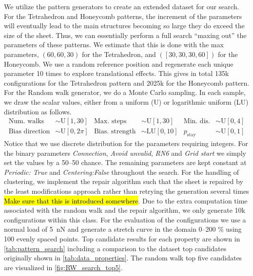We utilize the pattern generators to create an extended dataset for our search. For the Tetrahedron and Honeycomb patterns, the increment of the parameters will eventually lead to the main structures becoming so large they do exceed the size of the sheet. Thus, we can essentially perform a
full search ``maxing out'' the parameters of these patterns. We estimate
that this is done with the max parameters, $(60, 60, 30)$ for the Tetrahedron,
and $([30, 30, 30, 60])$ for the Honeycomb. We use a random reference position
and regenerate each unique parameter 10 times to explore translational effects. This gives in total 135k configurations for the
Tetrahedron pattern and 2025k for the Honeycomb pattern. For the Random walk
generator, we do a Monte Carlo sampling. In each sample, we draw the scalar values, either from a uniform (U) or logarithmic uniform (LU) distribution as follows.
\begin{align*}
  \text{Num. walks} &\sim \text{U}[1, 30] & \text{Max. steps} &\sim \text{U}[1,30]  & \text{Min. dis.} &\sim \text{U}[0,4] \\
  \text{Bias direction} &\sim \text{U}[0, 2\pi] & \text{Bias. strength} &\sim \text{LU}[0,10]  & p_{\text{stay}} &\sim \text{U}[0,1]  
\end{align*}
Notice that we use discrete distribution for the parameters requiring integers. For the binary parameters \textit{Connection}, \textit{Avoid unvalid},
\textit{RN6} and \textit{Grid start} we simply set the values by a 50--50 chance. The remaining parameters are kept constant at \textit{Periodic: True} and \textit{Centering:False} throughout the search. For the handling of clustering, we implement the repair algorithm such that the sheet is repaired by the least modifications approach rather than retrying the generation several times \hl{Make sure that this is introduced somewhere}. Due to the extra computation time associated with the
random walk and the repair algorithm, we only generate 10k configurations within
this class. For the evaluation of the configurations we use a normal load of \SI{5}{nN} and generate a stretch curve in the domain 0--200 \% using 100 evenly spaced points. Top candidate results for each property are shown in
\cref{tab:pattern_search} including a comparison to the dataset top candidates
originally shown in \cref{tab:data_properties}. The random walk top five candidates are visualized in \cref{fig:RW_search_top5}.

